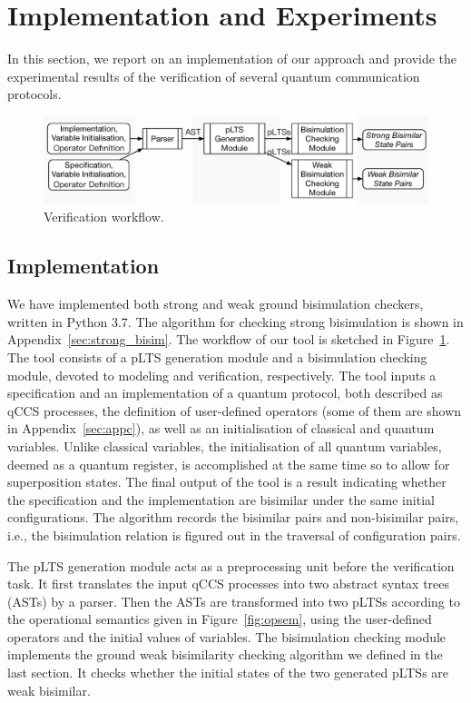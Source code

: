 \documentclass[runningheads]{llncs}
\begin{document}
\section{Implementation and Experiments}
\label{sec:experiment}
In this section, we report on an implementation of our approach and provide the experimental results of the verification of several quantum communication protocols. 

\begin{figure}[htbp]
\centering
\includegraphics[width=\textwidth]{images/architecture.eps}
\caption{Verification workflow.}
\label{fig:arch}
\end{figure}

\subsection{Implementation}
We have implemented both strong and weak ground bisimulation checkers, written in Python 3.7. The algorithm for checking strong bisimulation is shown in Appendix~\ref{sec:strong_bisim}. The workflow of our tool is sketched in Figure~\ref{fig:arch}. The tool consists of a pLTS generation module and a bisimulation checking module, devoted to modeling and verification, respectively.
The tool inputs a specification and an implementation of a quantum protocol, both described as qCCS processes, the definition of user-defined operators (some of them are shown in Appendix~\ref{sec:appc}), as well as an initialisation of classical and quantum variables. Unlike classical variables, the initialisation of all quantum variables, deemed as a quantum register, is accomplished at the same time so to allow for superposition states.
The final output of the tool is a result indicating whether the specification and the implementation are bisimilar under the same initial configurations. The algorithm records the bisimilar pairs and non-bisimilar pairs, i.e., the bisimulation relation is figured out in the traversal of configuration pairs.
%

The pLTS generation module acts as a preprocessing unit before the verification task. It first translates the input qCCS processes into two abstract syntax trees (ASTs) by a parser. Then the ASTs are transformed into two pLTSs according to the operational semantics given in Figure~\ref{fig:opsem}, using the user-defined operators and the initial values of variables.
%
The bisimulation checking module implements the ground weak bisimilarity checking algorithm we defined in the last section. It checks whether the initial states of the two generated pLTSs are weak bisimilar. 
\end{document}
